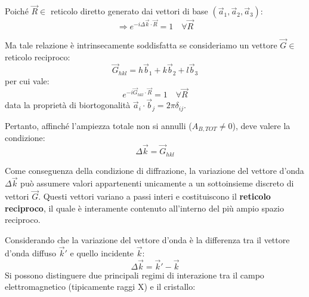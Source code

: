 Poiché \( \vec{R} \in \) reticolo diretto generato dai vettori di base \( (\vec{a}_1, \vec{a}_2, \vec{a}_3) \):
\begin{equation}
    \Rightarrow e^{-i \Delta\vec{k} \cdot \vec{R}} = 1 \quad \forall \vec{R}
\end{equation}

Ma tale relazione è intrinsecamente soddisfatta se consideriamo un vettore \( \vec{G} \in \) reticolo reciproco:
\begin{equation}
    \vec{G}_{hkl} = h\vec{b}_1 + k\vec{b}_2 + l\vec{b}_3
\end{equation}
per cui vale:
\begin{equation}
    e^{-i \vec{G}_{hkl} \cdot \vec{R}} = 1 \quad \forall \vec{R}
\end{equation}
data la proprietà di biortogonalità \( \vec{a}_i \cdot \vec{b}_j = 2\pi\delta_{ij} \).

Pertanto, affinché l'ampiezza totale non si annulli (\( A_{B,TOT} \neq 0 \)), deve valere la condizione:
\begin{equation}
    \Delta\vec{k} = \vec{G}_{hkl}
\end{equation}

Come conseguenza della condizione di diffrazione, la variazione del vettore d'onda \(\Delta\vec{k}\) può assumere valori appartenenti unicamente a un sottoinsieme discreto di vettori \(\vec{G}\). Questi vettori variano a passi interi e costituiscono il \textbf{reticolo reciproco}, il quale è interamente contenuto all'interno del più ampio spazio reciproco.

Considerando che la variazione del vettore d'onda è la differenza tra il vettore d'onda diffuso \(\vec{k}'\) e quello incidente \(\vec{k}\):
\begin{equation}
    \Delta\vec{k} = \vec{k}' - \vec{k}
\end{equation}
Si possono distinguere due principali regimi di interazione tra il campo elettromagnetico (tipicamente raggi X) e il cristallo:

